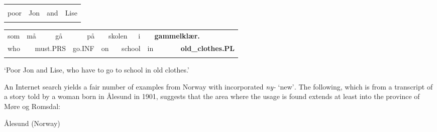 \begin{tabular}{llll}
\lsptoprule
\multicolumn{4}{l}{Stakkars

}\\
poor & Jon & and & Lise\\
\lspbottomrule
\end{tabular}

\begin{tabular}{llllllllllllll}
\lsptoprule
som & \multicolumn{2}{l}{må

} & \multicolumn{2}{l}{gå

} & \multicolumn{2}{l}{på

} & \multicolumn{2}{l}{skolen

} & \multicolumn{2}{l}{i

} & \multicolumn{2}{l}{{\bfseries gammelklær.}

} & \\
\multicolumn{2}{l}{who

} & \multicolumn{2}{l}{must.PRS

} & \multicolumn{2}{l}{go.INF

} & \multicolumn{2}{l}{on

} & \multicolumn{2}{l}{school

} & \multicolumn{2}{l}{in

} & \multicolumn{2}{l}{{\bfseries old\_clothes.PL}

}\\
\lspbottomrule
\end{tabular}

\begin{styleTranslation}
‘Poor Jon and Lise, who have to go to school in old clothes.’

\end{styleTranslation}

\begin{styleBodyTextFirst}
An Internet search yields a fair number of examples from Norway with incorporated \textit{ny-} ‘new’\textit{. }The following, which is from a transcript of a story told by a woman born in Ålesund in 1901, suggests that the area where the usage is found extends at least into the province of Møre og Romsdal:

\end{styleBodyTextFirst}

\begin{listWWNumileveli}
\item 

\begin{styleExample}
Ålesund (Norway)

\end{styleExample}

\end{listWWNumileveli}

